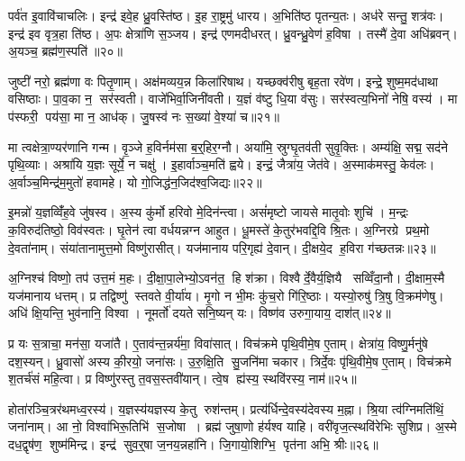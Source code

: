 पर्व॑त इ॒वावि॑चाचलिः। इन्द्र॑ इवे॒ह ध्रु॒वस्ति॑ष्ठ। इ॒ह रा॒ष्ट्रमु॑ धारय। अ॒भिति॑ष्ठ पृतन्य॒तः। अध॑रे सन्तु॒ शत्र॑वः। इन्द्र॑ इव वृत्र॒हा ति॑ष्ठ। अ॒पः क्षेत्रा॑णि स॒ञ्जय\sn{}। इन्द्र॑ एणमदीधरत्। ध्रु॒वन्ध्रु॒वेण॑ ह॒विषा। तस्मै॑ दे॒वा अधि॑ब्रवन्। अ॒यञ्च॒ ब्रह्म॑ण॒स्पति॑॥२०॥\anuvakamend[ह॒विर्भि॑रा॒स्य॑मभि॒ दास॑तो विप॒श्चित॒मप्र॑यावञ्जी॒वसे॒ ददा॑ना व्यथिष्ठा ब्रव॒न्नेकं च]

जुष्टी॑ नरो॒ ब्रह्म॑णा वः पितृ॒णाम्। अक्ष॑मव्यय॒न्न किला॑रिषाथ। यच्छक्व॑रीषु बृह॒ता रवे॑ण। इन्द्रे॒ शुष्म॒मद॑धाथा वसिष्ठाः। पा॒व॒का न॒ सर॑स्वती। वाजे॑भिर्वा॒जिनी॑वती। य॒ज्ञं व॑ष्टु धि॒या व॑सुः। सर॑स्वत्य॒भिनो॑ नेषि॒ वस्य॑। मा प॑स्फरी॒ पय॑सा॒ मा न॒ आध॑क्। जु॒षस्व॑ नः स॒ख्या॑ वे॒श्या॑ च॥२१॥

मा त्वक्षेत्रा॒ण्यर॑णानि गन्म। वृ॒ञ्जे ह॒विर्नम॑सा ब॒र्॒हिर॒ग्नौ। अया॑मि॒ स्रुग्घृ॒तव॑ती सुवृ॒क्तिः। अम्य॑क्षि॒ सद्म॒ सद॑ने पृथि॒व्याः। अश्रा॑यि य॒ज्ञः सूर्ये॒ न चक्षु॑। इ॒हार्वाञ्च॒मति॑ ह्वये। इन्द्रं॒ जैत्रा॑य॒ जेत॑वे। अ॒स्माक॑मस्तु॒ केव॑लः। अ॒र्वाञ्च॒मिन्द्र॑म॒मुतो॑ हवामहे। यो गो॒जिद्ध॑न॒जिद॑श्व॒जिद्यः॥२२॥

इ॒मन्नो॑ य॒ज्ञव्विँ॑ह॒वे जु॑षस्व। अ॒स्य कु॑र्मो हरिवो मे॒दिन॑न्त्वा। असं॑मृष्टो जायसे मातृ॒वोः शुचि॑। म॒न्द्रः क॒विरुद॑तिष्ठो॒ विव॑स्वतः। घृ॒तेन॑ त्वा वर्धयन्नग्न आहुत। धू॒मस्ते॑ के॒तुर॑भवद्दि॒वि श्रि॒तः। अ॒ग्निरग्रे प्रथ॒मो दे॒वता॑नाम्। संया॑तानामुत्त॒मो विष्णु॑रासीत्। यज॑मानाय परि॒गृह्य॑ दे॒वान्। दी॒क्षये॒द ह॒विरा ग॑च्छतन्नः॥२३॥

अ॒ग्निश्च॑ विष्णो॒ तप॑ उत्त॒मं म॒हः। दी॒क्षा॒पा॒लेभ्यो॒ऽवन॑त॒ हि श॑क्रा। विश्वैर्दे॒वैर्य॒ज्ञियै सव्विँदा॒नौ। दी॒क्षाम॒स्मै यज॑मानाय धत्तम्। प्र तद्विष्णु॑ स्तवते वी॒र्या॑य। मृ॒गो न भी॒मः कु॑च॒रो गि॑रि॒ष्ठाः। यस्यो॒रुषु॑ त्रि॒षु वि॒क्रम॑णेषु। अधि॑ क्षि॒यन्ति॒ भुव॑नानि॒ विश्वा। नूमर्तो॑ दयते सनि॒ष्यन् यः। विष्ण॑व उरुगा॒याय॒ दाश॑त्॥२४॥

प्र यः स॒त्राचा॒ मन॑सा॒ यजा॑तै। ए॒ताव॑न्त॒न्नर्य॑मा॒ विवा॑सात्। विच॑क्रमे पृथि॒वीमे॒ष ए॒ताम्। क्षेत्रा॑य॒ विष्णु॒र्मनु॑षे दश॒स्यन्। ध्रु॒वासो॑ अस्य की॒रयो॒ जना॑सः। उ॒रु॒क्षि॒ति सु॒जनि॑मा चकार। त्रिर्दे॒वः पृ॑थि॒वीमे॒ष ए॒ताम्। विच॑क्रमे श॒तर्च॑सं महि॒त्वा। प्र विष्णु॑रस्तु त॒वस॒स्तवी॑यान्। त्वे॒ष ह्य॑स्य॒ स्थवि॑रस्य॒ नाम॑॥२५॥

होता॑रञ्चि॒त्रर॑थमध्व॒रस्य॑। य॒ज्ञस्य॑यज्ञस्य के॒तु रुश॑न्तम्। प्रत्य॑र्धिन्दे॒वस्य॑देवस्य म॒ह्ना। श्रि॒या त्व॑ग्निमति॑थिं॒ जना॑नाम्। आ नो॒ विश्वा॑भिरू॒तिभि॑ स॒जोषा। ब्रह्म॑ जुषा॒णो ह॑र्यश्व याहि। वरी॑वृज॒त्स्थवि॑रेभिः सुशिप्र। अ॒स्मे दध॒द्वृष॑ण॒ शुष्म॑मिन्द्र। इन्द्र॑ सुव॒र्॒षा ज॒नय॒न्नहा॑नि। जि॒गायो॒शिग्भि॒ पृत॑ना अभि॒ श्रीः॥२६॥

